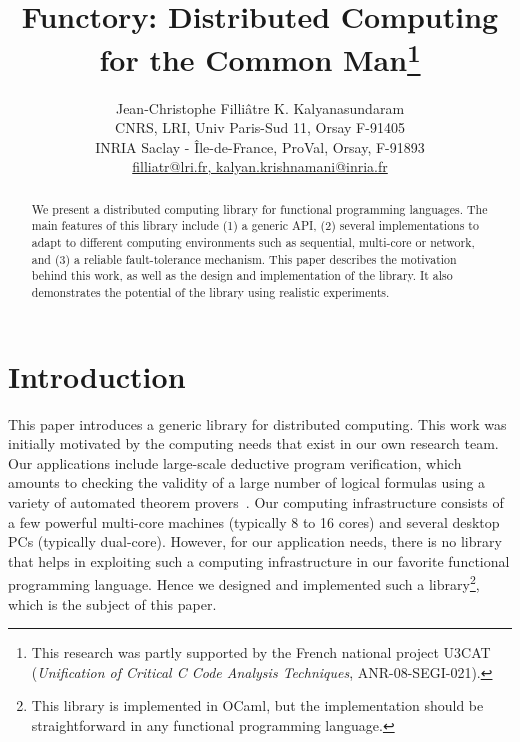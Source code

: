 \documentclass[a4paper,12pt]{article}
\newcommand{\Ocaml}{OCaml}
\begin{document}
\title{Functory: Distributed Computing for the Common Man\thanks{This
    research was partly supported by the French national project U3CAT
    (\emph{Unification of Critical C Code Analysis Techniques},
    ANR-08-SEGI-021).}} 

\author{Jean-Christophe Filli\^{a}tre \quad K. Kalyanasundaram \\
  CNRS, LRI, Univ Paris-Sud 11, Orsay F-91405\\
  INRIA Saclay - \^{I}le-de-France, ProVal, Orsay, F-91893 \\
   \url{filliatr@lri.fr, kalyan.krishnamani@inria.fr}}

\maketitle

\begin{abstract}
  We present a distributed computing library for
  functional programming languages. The main features of this library
  include (1) a generic API, (2) several implementations to
  adapt to different computing environments such as sequential,
  multi-core or network, and (3) a reliable fault-tolerance mechanism.
  This paper describes the motivation behind this work, as well as
  the design and implementation of the library. It also demonstrates
  the potential of the library using realistic experiments.
\end{abstract}


\section{Introduction}

This paper introduces a generic library for distributed computing. This
work was initially motivated by the computing needs that exist in our
own research team. Our applications include large-scale deductive
program verification, which amounts to checking the validity of a
large number of logical formulas using a variety of automated theorem
provers~\cite{filliatre07cav}. Our computing infrastructure consists
of a few powerful multi-core machines (typically 8 to 16 cores) and
several desktop PCs (typically dual-core). However, for our
application needs, there is no library that helps in exploiting such a
computing infrastructure in our favorite functional programming
language.  Hence we designed and implemented such a
library\footnote{This library is implemented in \Ocaml, but the
  implementation should be straightforward in any functional
  programming language.}, which is the subject of this paper.
\end{document}
